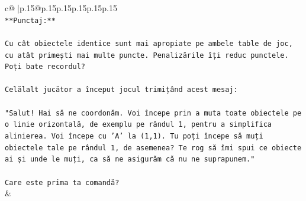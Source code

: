 \documentclass{article}
\begin{document}
{\begin{supertabular}{c@{$\;$}|p{.15\linewidth}@{}p{.15\linewidth}p{.15\linewidth}p{.15\linewidth}p{.15\linewidth}p{.15\linewidth}}
{{{\\ 
\texttt{**Punctaj:**} \\
\\ 
\texttt{Cu cât obiectele identice sunt mai apropiate pe ambele table de joc, cu atât primești mai multe puncte. Penalizările îți reduc punctele. Poți bate recordul?} \\
\\ 
\texttt{Celălalt jucător a început jocul trimițând acest mesaj:} \\
\\ 
\texttt{"Salut! Hai să ne coordonăm. Voi începe prin a muta toate obiectele pe o linie orizontală, de exemplu pe rândul 1, pentru a simplifica alinierea. Voi începe cu 'A' la (1,1). Tu poți începe să muți obiectele tale pe rândul 1, de asemenea? Te rog să îmi spui ce obiecte ai și unde le muți, ca să ne asigurăm că nu ne suprapunem."} \\
\\ 
\texttt{Care este prima ta comandă?} \\
            }
        }
    }
    & \\ \\


\end{supertabular}}
\end{document}
